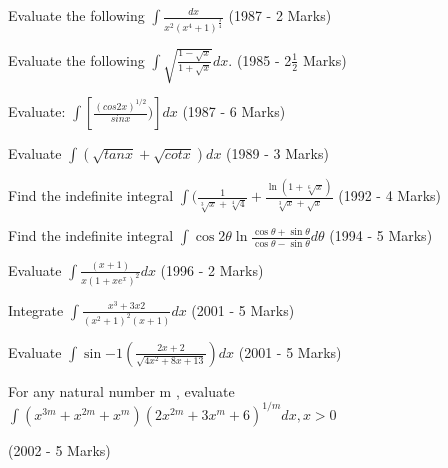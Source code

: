 \iffalse
\title{Assignment}
\author{K.AKSHAY TEJA}
\section{subjective}
\fi
    
\item   Evaluate the following $\int\frac{dx}{x^2(x^4 +1)^\frac{3}{4}} $ 
         \hfill  (1987 - 2 Marks)
\item   Evaluate the following $\int \sqrt{\frac{1 - \sqrt{x}}{1 + \sqrt{x}}}   dx$.\hfill
  (1985 - 2$\frac{1}{2}$ Marks)  


\item Evaluate: $\int$$[\frac{(cos2x)^{1/2}}{sin x})]dx$ \hfill  (1987 - 6 Marks)

\item   Evaluate {$\int(\sqrt{tan x}+\sqrt{cot x})dx$}      
  \hfill
(1989 - 3 Marks)
 

\item  Find the indefinite integral $\int$$(\frac{1}{\sqrt[3]{x} + \sqrt[4]{4}}+\frac{\ln (1+\sqrt[6]{x})}{\sqrt[3]{x}+\sqrt{x}}$  \hfill   (1992 - 4 Marks)

\item Find the indefinite integral \(\int \cos 2\theta \ln \frac{\cos \theta + \sin \theta}{\cos \theta - \sin \theta}   d\theta\) \hfill  (1994 - 5 Marks)


\item  Evaluate $\int\frac{(x + 1)}{x(1 + xe^x)^2}dx$  \hfill (1996 - 2 Marks)

\item Integrate $\int\frac{x^{3}+3x 2}{(x^{2}+ 1)^{2}(x + 1)}dx$ \hfill  (2001 - 5 Marks)

\item   Evaluate $\int \sin{-1} (\frac{2x + 2}{\sqrt{4x^{2}+8x+13}})dx$    \hfill    (2001 - 5 Marks)

\item  For any natural number m , evaluate ${\int(x^{3m} + x^{2m}+x^{m})(2x^{2m}+3x^{m}+6)^{1/m}dx,x>0}$

\hfill   (2002 - 5 Marks)
 

              

